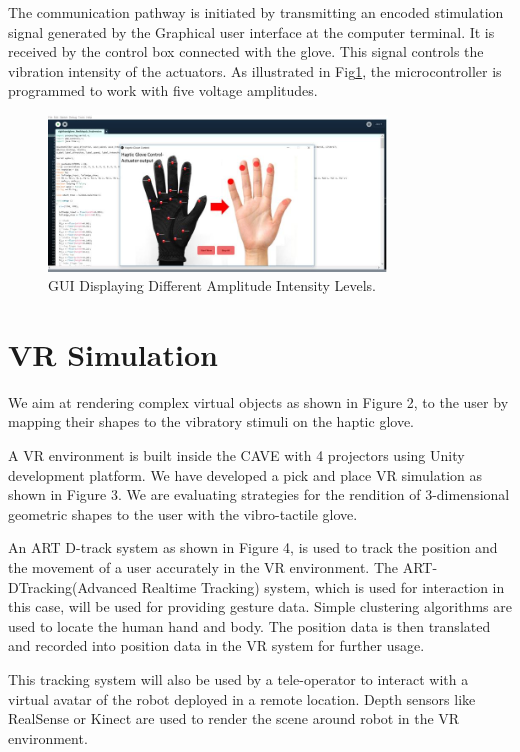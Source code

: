 The communication pathway is initiated by transmitting an encoded stimulation signal generated by the Graphical user interface at the computer terminal. It is received by the control box connected with the glove. This signal controls the vibration intensity of the actuators. As illustrated in Fig\ref{fig:gui-code}, the microcontroller is programmed to work with five voltage amplitudes. 

\begin{figure}[!ht]
  \centering
  \includegraphics[width=9cm]{figures/figure5.jpg}
  \caption{GUI Displaying Different Amplitude Intensity Levels.}
  \label{fig:gui-code}
\end{figure}


\section{VR Simulation}
We aim at rendering complex virtual objects as shown in Figure 2, to
the user by mapping their shapes to the vibratory stimuli on the
haptic glove.

A VR environment is built inside the CAVE with 4 projectors using
Unity development platform. We have developed a pick and place VR
simulation as shown in Figure 3. We are evaluating strategies for the
rendition of 3-dimensional geometric shapes to the user with the
vibro-tactile glove.

An ART D-track system as shown in Figure 4, is used to track the position and the movement of a user accurately in the VR environment. The ART-DTracking(Advanced Realtime Tracking) system, which is used for interaction in this case, will be used for providing gesture data. Simple clustering algorithms are used to locate the human hand and body. The position data is then translated and recorded into position data in the VR system for further usage.


This tracking system will also be used by a tele-operator to interact
with a virtual avatar of the robot deployed in a remote
location. Depth sensors like RealSense or Kinect are used to render
the scene around robot in the VR environment.
